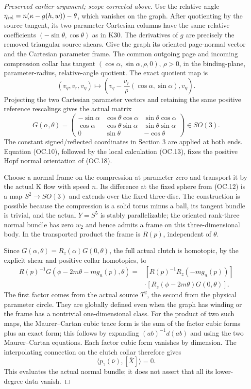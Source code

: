 \begin{proof}[Preserved earlier argument; scope corrected above]
Use the relative angle
\(\eta_{\rm rel}=n(\kappa-g(h,w))-\theta\), which vanishes on the graph.
After quotienting by the source tangent, its two parameter Cartesian
columns have the same relative coefficients \((-\sin \theta,\cos \theta)\)
as in K30. The derivatives of \(g\) are precisely the removed triangular
source shears. Give the graph its oriented page-normal vector and the
Cartesian parameter frame. The common outgoing page and incoming
compression collar has tangent
\((\cos \alpha,\sin \alpha,\rho,0)\), \(\rho>0\), in the binding-plane,
parameter-radius, relative-angle quotient. The exact quotient map is
\[
 (v_q,v_r,v_\eta)\longmapsto
 \left(v_q-\frac{v_r}{\rho}(\cos\alpha,\sin\alpha),v_\eta\right).
 \tag{OC.17}
\]
Projecting the two Cartesian parameter vectors and retaining the same
positive reference rescalings gives the actual matrix
\[
 G(\alpha,\theta)=
 \begin{pmatrix}
 -\sin\alpha&\cos\theta\cos\alpha&\sin\theta\cos\alpha\\
 \cos\alpha&\cos\theta\sin\alpha&\sin\theta\sin\alpha\\
 0&\sin\theta&-\cos\theta
 \end{pmatrix}\in SO(3).
 \tag{OC.18}
\]
The constant signed/reflected coordinates in Section 3 are applied
at both ends. Equation (OC.10), followed by the local calculation
(OC.13), fixes the positive Hopf normal orientation of (OC.18).

Choose a normal frame on the compression at parameter zero and
transport it by the actual K flow with speed \(n\). Its difference at
the fixed sphere from (OC.12) is a map \(S^2\longrightarrow SO(3)\) and extends over
the fixed three-disc. The construction is possible because the
compression is a solid torus minus a ball, its tangent bundle is
trivial, and the actual \(Y=S^5\) is stably parallelizable; the oriented
rank-three normal bundle has zero \(w_2\) and hence admits a frame on
this three-dimensional body. In the transported product the frame is
\(R(p)\), independent of \(\theta\).

Since \(G(\alpha,\theta)=R_z(\alpha)G(0,\theta)\), the full actual clutch is
homotopic, by the explicit shear and positive collar homotopies, to
\[
 \begin{split}
 R(p)^{-1}G(\phi-2m\theta-mg_n(p),\theta)
   ={}&[R(p)^{-1}R_z(-mg_n(p))]\\
     &\cdot[R_z(\phi-2m\theta)G(0,\theta)].
 \end{split}
 \tag{OC.19}
\]
The first factor comes from the actual source \(T^2\), the second from
the physical parameter circle. They are globally defined even when
the graph has winding or the frame has a nontrivial one-dimensional
class. For the product of two such maps, the Maurer--Cartan cubic
trace form is the sum of the factor cubic forms plus an exact form;
this follows by expanding \((ab)^{-1}d(ab)\) and using the two
Maurer--Cartan equations. Each factor cubic form vanishes by
dimension. The interpolating connection on the clutch collar
therefore gives
\[
             \langle p_1(\overline\nu),[\overline X]\rangle=0.
 \tag{OC.20}
\]
This evaluates the actual normal bundle; it does not assert that all
its lower-degree data vanish.


\end{proof}
